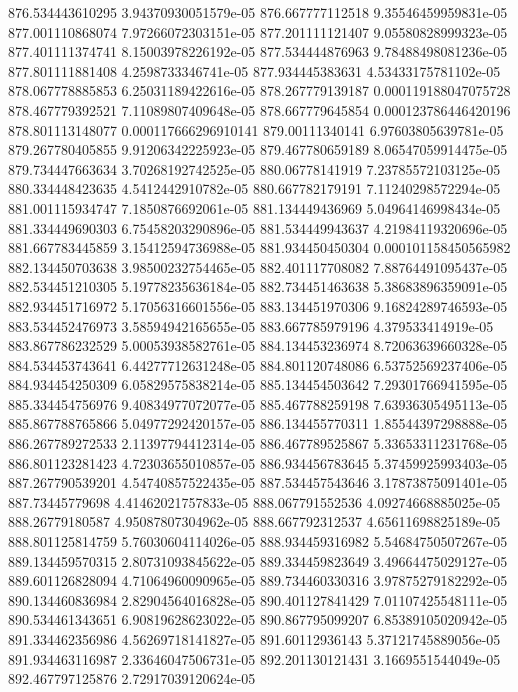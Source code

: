 {876.534443610295 3.94370930051579e-05
876.667777112518 9.35546459959831e-05
877.001110868074 7.97266072303151e-05
877.201111121407 9.05580828999323e-05
877.401111374741 8.15003978226192e-05
877.534444876963 9.78488498081236e-05
877.801111881408 4.2598733346741e-05
877.934445383631 4.53433175781102e-05
878.067778885853 6.25031189422616e-05
878.267779139187 0.000119188047075728
878.467779392521 7.11089807409648e-05
878.667779645854 0.000123786446420196
878.801113148077 0.000117666296910141
879.00111340141 6.97603805639781e-05
879.267780405855 9.91206342225923e-05
879.467780659189 8.06547059914475e-05
879.734447663634 3.70268192742525e-05
880.06778141919 7.23785572103125e-05
880.334448423635 4.5412442910782e-05
880.667782179191 7.11240298572294e-05
881.001115934747 7.1850876692061e-05
881.134449436969 5.04964146998434e-05
881.334449690303 6.75458203290896e-05
881.534449943637 4.21984119320696e-05
881.667783445859 3.15412594736988e-05
881.934450450304 0.000101158450565982
882.134450703638 3.98500232754465e-05
882.401117708082 7.88764491095437e-05
882.534451210305 5.19778235636184e-05
882.734451463638 5.38683896359091e-05
882.934451716972 5.17056316601556e-05
883.134451970306 9.16824289746593e-05
883.534452476973 3.58594942165655e-05
883.667785979196 4.379533414919e-05
883.867786232529 5.00053938582761e-05
884.134453236974 8.72063639660328e-05
884.534453743641 6.44277712631248e-05
884.801120748086 6.53752569237406e-05
884.934454250309 6.05829575838214e-05
885.134454503642 7.29301766941595e-05
885.334454756976 9.40834977072077e-05
885.467788259198 7.63936305495113e-05
885.867788765866 5.04977292420157e-05
886.134455770311 1.85544397298888e-05
886.267789272533 2.11397794412314e-05
886.467789525867 5.33653311231768e-05
886.801123281423 4.72303655010857e-05
886.934456783645 5.37459925993403e-05
887.267790539201 4.54740857522435e-05
887.534457543646 3.17873875091401e-05
887.73445779698 4.41462021757833e-05
888.067791552536 4.09274668885025e-05
888.26779180587 4.95087807304962e-05
888.667792312537 4.65611698825189e-05
888.801125814759 5.76030604114026e-05
888.934459316982 5.54684750507267e-05
889.134459570315 2.80731093845622e-05
889.334459823649 3.49664475029127e-05
889.601126828094 4.71064960090965e-05
889.734460330316 3.97875279182292e-05
890.134460836984 2.82904564016828e-05
890.401127841429 7.01107425548111e-05
890.534461343651 6.90819628623022e-05
890.867795099207 6.85389105020942e-05
891.334462356986 4.56269718141827e-05
891.60112936143 5.37121745889056e-05
891.934463116987 2.33646047506731e-05
892.201130121431 3.1669551544049e-05
892.467797125876 2.72917039120624e-05
}
